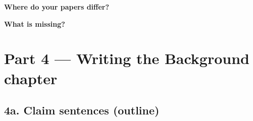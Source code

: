 \vspace{0.3cm}
\noindent\underline{\hspace{14cm}}

\vspace{0.5cm}

\noindent\textbf{Where do your papers differ?}

\vspace{0.2cm}
\noindent\underline{\hspace{14cm}}

\vspace{0.3cm}
\noindent\underline{\hspace{14cm}}

\vspace{0.3cm}
\noindent\underline{\hspace{14cm}}

\vspace{0.3cm}
\noindent\underline{\hspace{14cm}}

\vspace{0.5cm}

\noindent\textbf{What is missing?}

\vspace{0.2cm}
\noindent\underline{\hspace{14cm}}

\vspace{0.3cm}
\noindent\underline{\hspace{14cm}}

\vspace{0.3cm}
\noindent\underline{\hspace{14cm}}

\vspace{0.3cm}
\noindent\underline{\hspace{14cm}}


\section*{Part 4 — Writing the Background chapter}

\subsection*{4a. Claim sentences (outline)}

